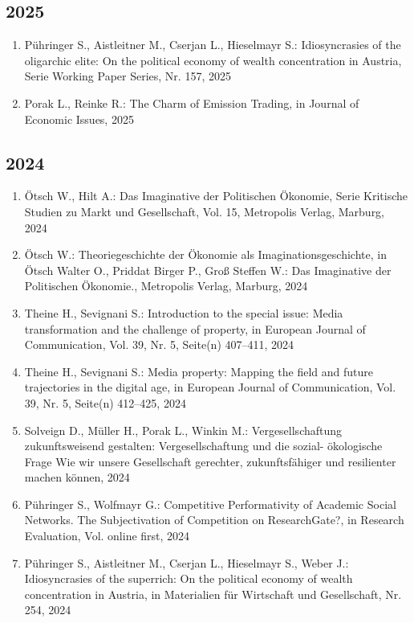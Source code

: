 \subsection*{2025}
\begin{enumerate}
    	 \item Pühringer S., Aistleitner M., Cserjan L., Hieselmayr S.: Idiosyncrasies of the oligarchic elite: On the political economy of wealth concentration in Austria, Serie Working Paper Series, Nr. 157, 2025
	 \item Porak L., Reinke R.: The Charm of Emission Trading, in Journal of Economic Issues, 2025
\end{enumerate}
\subsection*{2024}
\begin{enumerate}
    	 \item Ötsch W., Hilt A.: Das Imaginative der Politischen Ökonomie, Serie Kritische Studien zu Markt und Gesellschaft, Vol. 15, Metropolis Verlag, Marburg, 2024
	 \item Ötsch W.: Theoriegeschichte der Ökonomie als Imaginationsgeschichte, in Ötsch Walter O., Priddat Birger P., Groß Steffen W.: Das Imaginative der Politischen Ökonomie., Metropolis Verlag, Marburg, 2024
	 \item Theine H., Sevignani S.: Introduction to the special issue: Media transformation and the challenge of property, in European Journal of Communication, Vol. 39, Nr. 5, Seite(n) 407–411, 2024
	 \item Theine H., Sevignani S.: Media property: Mapping the field and future trajectories in the digital age, in European Journal of Communication, Vol. 39, Nr. 5, Seite(n) 412–425, 2024
	 \item Solveign D., Müller H., Porak L., Winkin M.: Vergesellschaftung zukunftsweisend gestalten: Vergesellschaftung und die sozial- ökologische Frage Wie wir unsere Gesellschaft gerechter, zukunftsfähiger und resilienter machen können, 2024
	 \item Pühringer S., Wolfmayr G.: Competitive Performativity of Academic Social Networks. The Subjectivation of Competition on ResearchGate?, in Research Evaluation, Vol. online first, 2024
	 \item Pühringer S., Aistleitner M., Cserjan L., Hieselmayr S., Weber J.: Idiosyncrasies of the superrich: On the political economy of wealth concentration in Austria, in Materialien für Wirtschaft und Gesellschaft, Nr. 254, 2024

\end{enumerate}
